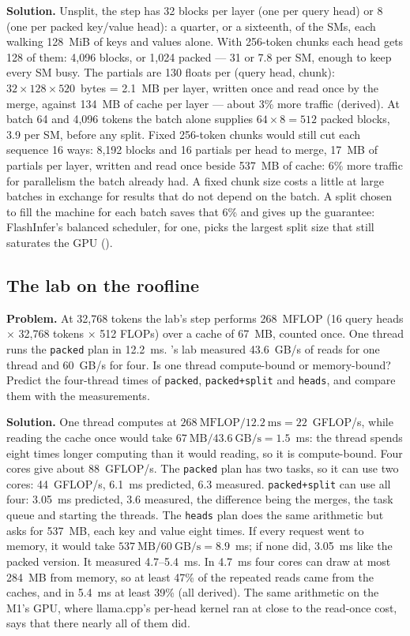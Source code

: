 \textbf{Solution.} Unsplit, the step has 32 blocks per layer (one per query head)
or 8 (one per packed key/value head): a quarter, or a sixteenth, of the SMs,
each walking 128~MiB of keys and values alone. With 256-token chunks each head
gets 128 of them: 4,096 blocks, or 1,024 packed --- 31 or 7.8 per SM, enough to
keep every SM busy. The partials are 130 floats per (query head, chunk):
$32 \times 128 \times 520$~bytes = 2.1~MB per layer, written once and read once
by the merge, against 134~MB of cache per layer --- about 3\% more traffic
(derived). At batch 64 and 4,096 tokens the batch alone supplies
$64 \times 8 = 512$ packed blocks, 3.9 per SM, before any split. Fixed 256-token
chunks would still cut each sequence 16 ways: 8,192 blocks and 16 partials per
head to merge, 17~MB of partials per layer, written and read once beside 537~MB
of cache: 6\% more traffic for parallelism the batch already had. A fixed chunk size costs a
little at large batches in exchange for results that do not depend on the
batch. A split chosen to fill the machine for each batch saves that 6\% and
gives up the guarantee: FlashInfer's balanced scheduler, for one, picks the
largest split size that still saturates the GPU \cite{he2025nondeterminism}
().

\subsection{The lab on the roofline}
\textbf{Problem.} At 32,768 tokens the lab's step performs 268~MFLOP (16 query
heads $\times$ 32,768 tokens $\times$ 512 FLOPs) over a cache of 67~MB, counted
once. One thread runs the \texttt{packed} plan in 12.2~ms. 's lab
measured 43.6~GB/s of reads for one thread and 60~GB/s for four. Is one thread
compute-bound or memory-bound? Predict the four-thread times of
\texttt{packed}, \texttt{packed+split} and \texttt{heads}, and compare them with
the measurements.

\textbf{Solution.} One thread computes at $268~\text{MFLOP} / 12.2~\text{ms} =
22$~GFLOP/s, while reading the cache once would take $67~\text{MB} / 43.6~\text{GB/s}
= 1.5$~ms: the thread spends eight times longer computing than it would reading,
so it is compute-bound. Four cores give about 88~GFLOP/s. The \texttt{packed} plan
has two tasks, so it can use two cores: 44~GFLOP/s, 6.1~ms predicted, 6.3
measured. \texttt{packed+split} can use all four: 3.05~ms predicted, 3.6
measured, the difference being the merges, the task queue and starting the
threads. The \texttt{heads} plan does the same arithmetic but asks for 537~MB,
each key and value eight times. If every request went to memory, it would take
$537~\text{MB} / 60~\text{GB/s} = 8.9$~ms; if none did, 3.05~ms like the packed
version. It measured 4.7--5.4~ms. In 4.7~ms four cores can draw at most 284~MB
from memory, so at least 47\% of the repeated reads came from the caches, and in
5.4~ms at least 39\% (all derived). The same arithmetic on the M1's GPU, where
llama.cpp's per-head kernel ran at close to the read-once cost, says that there
nearly all of them did.
